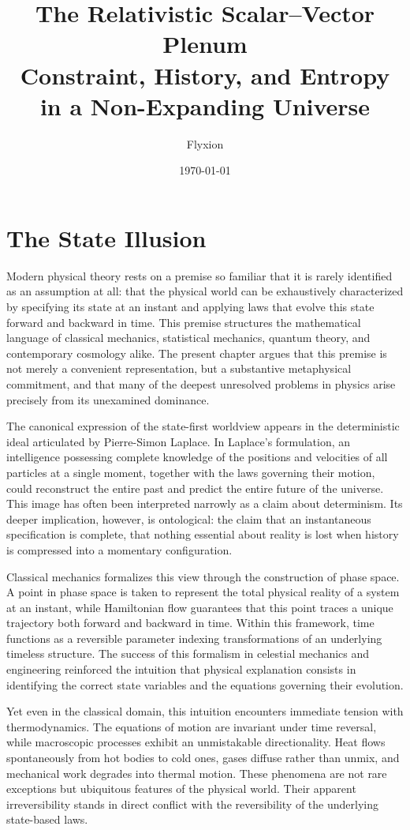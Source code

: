 \documentclass[11pt,oneside]{book}
\title{%
The Relativistic Scalar--Vector Plenum\\
{\large Constraint, History, and Entropy in a Non-Expanding Universe}
}
\author{Flyxion}
\date{\today}
\begin{document}
\frontmatter
\maketitle


\chapter{The State Illusion}

Modern physical theory rests on a premise so familiar that it is rarely identified as an assumption at all: that the physical world can be exhaustively characterized by specifying its state at an instant and applying laws that evolve this state forward and backward in time. This premise structures the mathematical language of classical mechanics, statistical mechanics, quantum theory, and contemporary cosmology alike. The present chapter argues that this premise is not merely a convenient representation, but a substantive metaphysical commitment, and that many of the deepest unresolved problems in physics arise precisely from its unexamined dominance.

The canonical expression of the state-first worldview appears in the deterministic ideal articulated by Pierre-Simon Laplace. In Laplace’s formulation, an intelligence possessing complete knowledge of the positions and velocities of all particles at a single moment, together with the laws governing their motion, could reconstruct the entire past and predict the entire future of the universe. This image has often been interpreted narrowly as a claim about determinism. Its deeper implication, however, is ontological: the claim that an instantaneous specification is complete, that nothing essential about reality is lost when history is compressed into a momentary configuration.

Classical mechanics formalizes this view through the construction of phase space. A point in phase space is taken to represent the total physical reality of a system at an instant, while Hamiltonian flow guarantees that this point traces a unique trajectory both forward and backward in time. Within this framework, time functions as a reversible parameter indexing transformations of an underlying timeless structure. The success of this formalism in celestial mechanics and engineering reinforced the intuition that physical explanation consists in identifying the correct state variables and the equations governing their evolution.

Yet even in the classical domain, this intuition encounters immediate tension with thermodynamics. The equations of motion are invariant under time reversal, while macroscopic processes exhibit an unmistakable directionality. Heat flows spontaneously from hot bodies to cold ones, gases diffuse rather than unmix, and mechanical work degrades into thermal motion. These phenomena are not rare exceptions but ubiquitous features of the physical world. Their apparent irreversibility stands in direct conflict with the reversibility of the underlying state-based laws.
\end{document}
